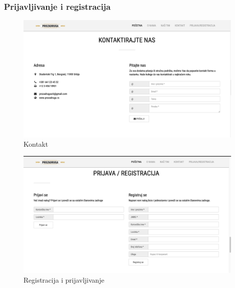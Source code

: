 \documentclass[a4paper, oneside]{article}
\begin{document}
\subsubsection{Prijavljivanje i registracija}
\begin{figure}[h!]
    \centering
    \includegraphics[scale=0.3]{images/contact.png}
    \caption{Kontakt}
    \label{contact}
\end{figure}

\begin{figure}[h!]
    \centering
    \includegraphics[scale=0.3]{images/register.png}
    \caption{Registracija i prijavljivanje}
    \label{register}
\end{figure}


\newpage
\end{document}
